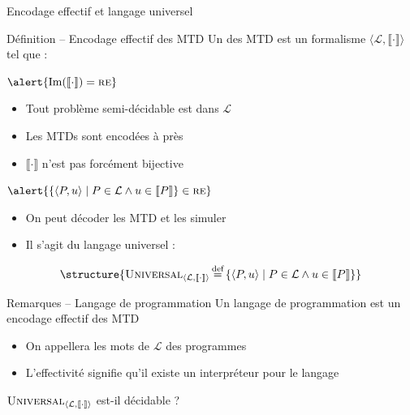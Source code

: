 
\begingroup

\begin{frame}{Encodage effectif et langage universel}

  \vspace{-2mm}
  \begin{block}{Définition -- Encodage effectif des MTD}
    Un  des MTD est un formalisme 
    \alert{$\langle \mathcal{L}, \llbracket \cdot \rrbracket \rangle$} tel que :
    \begin{description}
    \item[Turing-complet :] $\alert{\operatorname{Im}(\llbracket \cdot \rrbracket) = \textsc{re}}$
      \begin{itemize}\small
      \item Tout problème semi-décidable est  dans $\mathcal{L}$
      \item Les MTDs sont encodées à  près
      \item $\llbracket \cdot \rrbracket$ n'est pas forcément bijective
      \end{itemize}
    \item[Effectif :] $\alert{\left\{ \langle P, u \rangle \mid P \in \mathcal{L} \land u \in \llbracket P \rrbracket \right\} \in \textsc{re}}$
      \begin{itemize}\small
      \item On peut décoder les MTD et les simuler
      \item Il s'agit du langage universel :
      \end{itemize}
    \end{description}
        $$\structure{\textsc{Universal}_{\langle \mathcal{L}, \llbracket \cdot \rrbracket \rangle} \eqdef \left\{ \langle P, u \rangle \mid P \in \mathcal{L} \land u \in \llbracket P \rrbracket \right\}}$$

  \end{block}

  \pause

  \vspace{-2mm}
  \begin{alertblock}{Remarques -- Langage de programmation}
    Un \alert{langage de programmation} est un encodage effectif des MTD
    \begin{itemize}
    \item On appellera les mots de $\mathcal{L}$ des \alert{programmes}
    \item L'effectivité signifie qu'il existe un \alert{interpréteur} pour le langage
    \end{itemize}

    \begin{center}
      \alert{$\textsc{Universal}_{\langle \mathcal{L}, \llbracket \cdot \rrbracket \rangle}$ est-il décidable ?}
    \end{center}
  \end{alertblock}
  
\end{frame}

\endgroup
\endinput
